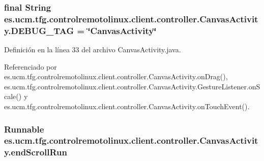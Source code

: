 \hypertarget{classes_1_1ucm_1_1tfg_1_1controlremotolinux_1_1client_1_1controller_1_1CanvasActivity_a6eb4ed0771188a692df57ceca3fb5f7e}{
\subsubsection[{D\-E\-B\-U\-G\-\_\-\-T\-A\-G}]{\setlength{\rightskip}{0pt plus 5cm}final String es.\-ucm.\-tfg.\-controlremotolinux.\-client.\-controller.\-Canvas\-Activity.\-D\-E\-B\-U\-G\-\_\-\-T\-A\-G = \char`\"{}Canvas\-Activity\char`\"{}\hspace{0.3cm}{\ttfamily [static]}}}\label{classes_1_1ucm_1_1tfg_1_1controlremotolinux_1_1client_1_1controller_1_1CanvasActivity_a6eb4ed0771188a692df57ceca3fb5f7e}


Definición en la línea 33 del archivo Canvas\-Activity.\-java.



Referenciado por es.\-ucm.\-tfg.\-controlremotolinux.\-client.\-controller.\-Canvas\-Activity.\-on\-Drag(), es.\-ucm.\-tfg.\-controlremotolinux.\-client.\-controller.\-Canvas\-Activity.\-Gesture\-Listener.\-on\-Scale() y es.\-ucm.\-tfg.\-controlremotolinux.\-client.\-controller.\-Canvas\-Activity.\-on\-Touch\-Event().

\hypertarget{classes_1_1ucm_1_1tfg_1_1controlremotolinux_1_1client_1_1controller_1_1CanvasActivity_ae5baf801f9649f1234cfe1140a3fb6f5}{
\subsubsection[{end\-Scroll\-Run}]{\setlength{\rightskip}{0pt plus 5cm}Runnable es.\-ucm.\-tfg.\-controlremotolinux.\-client.\-controller.\-Canvas\-Activity.\-end\-Scroll\-Run\hspace{0.3cm}{\ttfamily [private]}}}\label{classes_1_1ucm_1_1tfg_1_1controlremotolinux_1_1client_1_1controller_1_1CanvasActivity_ae5baf801f9649f1234cfe1140a3fb6f5}


